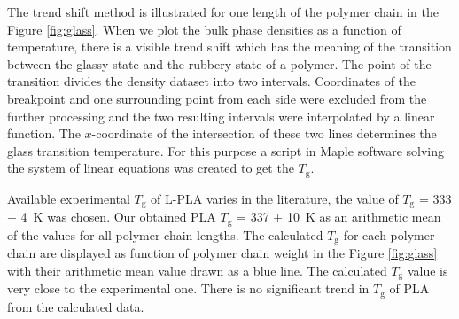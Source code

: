 The trend shift method is illustrated for one length of the polymer chain in the Figure \ref{fig:glass}. When we plot the bulk phase densities as a function of temperature, there is a visible trend shift which has the meaning of the transition between the glassy state and the rubbery state of a polymer. The point of the transition divides the density dataset into two intervals. Coordinates of the breakpoint and one surrounding point from each side were excluded from the further processing and the two resulting intervals were interpolated by a linear function. The $x$-coordinate of the intersection of these two lines determines the glass transition temperature. For this purpose a script in Maple software solving the system of linear equations was created to get the $T_\mathrm{g}$.

Available experimental $T_\mathrm{g}$ of L-PLA varies in the literature, the value  of $T_\mathrm{g}$ = 333 $\pm$ 4~K \cite{pyda_reversing_2005} was chosen. Our obtained PLA $T_\mathrm{g}$ = 337 $\pm$ 10~K as an arithmetic mean of the values for all polymer chain lengths. The calculated $T_\mathrm{g}$ for each polymer chain are displayed as function of polymer chain weight in the Figure \ref{fig:glass} with their arithmetic mean value drawn as a blue line. The calculated $T_\mathrm{g}$ value is very close to the experimental one. There is no significant trend in $T_\mathrm{g}$ of PLA from the calculated data. 


